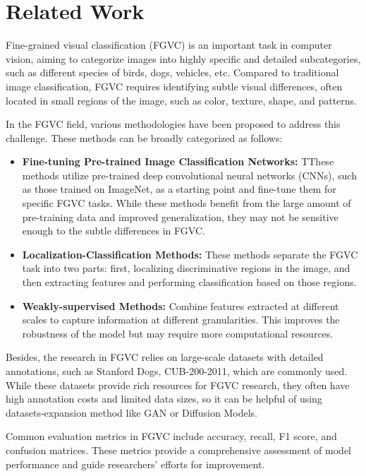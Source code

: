\section{Related Work}
\label{sec:related_work}

Fine-grained visual classification (FGVC) is an important task in computer vision, aiming to categorize images into highly specific and detailed subcategories, such as different species of birds, dogs, vehicles, etc. Compared to traditional image classification, FGVC requires identifying subtle visual differences, often located in small regions of the image, such as color, texture, shape, and patterns.

In the FGVC field, various methodologies have been proposed to address this challenge. These methods can be broadly categorized as follows:
\begin{itemize}
    \item \textbf{Fine-tuning Pre-trained Image Classification Networks:} TThese methods utilize pre-trained deep convolutional neural networks (CNNs), such as those trained on ImageNet, as a starting point and fine-tune them for specific FGVC tasks. While these methods benefit from the large amount of pre-training data and improved generalization, they may not be sensitive enough to the subtle differences in FGVC.
    \item \textbf{Localization-Classification Methods:} These methods separate the FGVC task into two parts: first, localizing discriminative regions in the image, and then extracting features and performing classification based on those regions.
    \item \textbf{Weakly-supervised Methods:} Combine features extracted at different scales to capture information at different granularities. This improves the robustness of the model but may require more computational resources.
\end{itemize}

Besides, the research in FGVC relies on large-scale datasets with detailed annotations, such as Stanford Dogs, CUB-200-2011, which are commonly used. While these datasets provide rich resources for FGVC research, they often have high annotation costs and limited data sizes, so it can be helpful of using datasets-expansion method like GAN or Diffusion Models. 

Common evaluation metrics in FGVC include accuracy, recall, F1 score, and confusion matrices. These metrics provide a comprehensive assessment of model performance and guide researchers' efforts for improvement.

